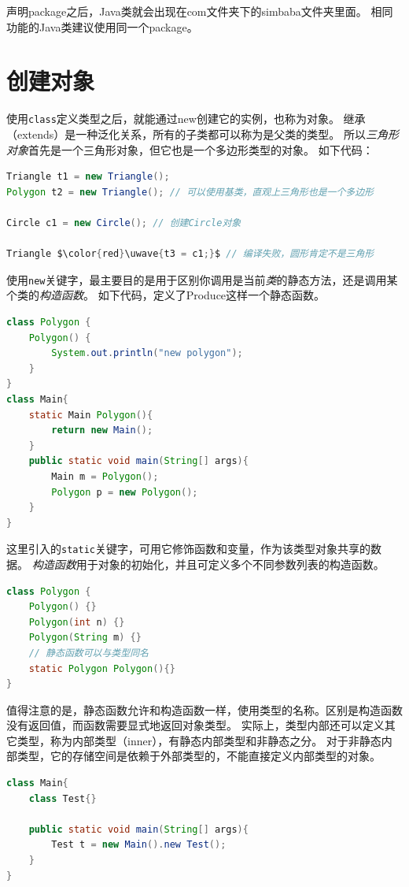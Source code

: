 声明package之后，Java类就会出现在com文件夹下的simbaba文件夹里面。
相同功能的Java类建议使用同一个package。


\section{创建对象}
使用\lstinline{class}定义类型之后，就能通过new创建它的实例，也称为对象。
继承（extends）是一种泛化关系，所有的子类都可以称为是父类的类型。
所以\emph{三角形对象}首先是一个三角形对象，但它也是一个多边形类型的对象。
如下代码：
\begin{lstlisting}[language=Java,mathescape]
Triangle t1 = new Triangle();
Polygon t2 = new Triangle(); // 可以使用基类，直观上三角形也是一个多边形

Circle c1 = new Circle(); // 创建Circle对象

Triangle $\color{red}\uwave{t3 = c1;}$ // 编译失败，圆形肯定不是三角形
\end{lstlisting}

使用\lstinline{new}关键字，最主要目的是用于区别你调用是当前\emph{类}的静态方法，还是调用某个类的\emph{构造函数}。
如下代码，定义了Produce这样一个静态函数。
\begin{lstlisting}[language=Java,mathescape]
class Polygon {
    Polygon() {
        System.out.println("new polygon");
    }
}
class Main{
    static Main Polygon(){
        return new Main();
    }
    public static void main(String[] args){
        Main m = Polygon();
        Polygon p = new Polygon();
    }
}
\end{lstlisting}
这里引入的\lstinline{static}关键字，可用它修饰函数和变量，作为该类型对象共享的数据。
\emph{构造函数}用于对象的初始化，并且可定义多个不同参数列表的构造函数。
\begin{lstlisting}[language=Java,mathescape]
class Polygon {
    Polygon() {}
    Polygon(int n) {}
    Polygon(String m) {}
    // 静态函数可以与类型同名
    static Polygon Polygon(){}
}
\end{lstlisting}

值得注意的是，静态函数允许和构造函数一样，使用类型的名称。区别是构造函数没有返回值，而函数需要显式地返回对象类型。
实际上，类型内部还可以定义其它类型，称为内部类型（inner），有静态内部类型和非静态之分。
对于非静态内部类型，它的存储空间是依赖于外部类型的，不能直接定义内部类型的对象。
\begin{lstlisting}[language=Java,mathescape]
class Main{
    class Test{}

    public static void main(String[] args){
        Test t = new Main().new Test();
    }
}
\end{lstlisting}

